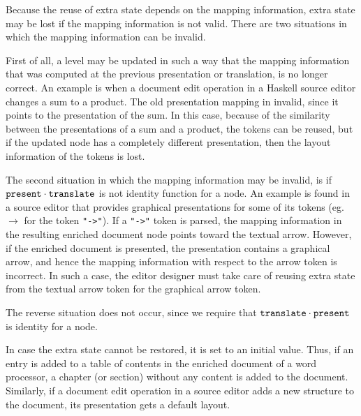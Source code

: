Because the reuse of extra state depends on the mapping information, extra state may be lost if the mapping information is not valid. There are two situations in which the mapping information can be invalid.  

First of all, a level may be updated in such a way that the mapping information that was computed at the previous presentation or translation, is no longer correct. An example is when a document edit operation in a Haskell source editor changes a sum to a product. The old presentation mapping in invalid, since it points to the presentation of the sum. In this case, because of the similarity between the presentations of a sum and a product, the tokens can be reused, but if the updated node has a completely different presentation, then the layout information of the tokens is lost.

The second situation in which the mapping information may be invalid, is if 
${\tt present} \cdot {\tt translate}$ is not identity function for a node.  An example is found in a source editor that provides graphical presentations for some of its tokens (eg. $\rightarrow$ for the token \verb|"->"|). If a \verb|"->"| token is parsed, the mapping information in the resulting enriched document node points toward the textual arrow. However, if the enriched document is presented, the presentation contains a graphical arrow, and hence the mapping information with respect to the arrow token is incorrect. In such a case, the editor designer must take care of reusing extra state from the textual arrow token for the graphical arrow token.

The reverse situation does not occur, since we require that ${\tt translate} \cdot {\tt present}$ is identity for a node. 

In case the extra state cannot be restored, it is set to an initial value. Thus, if an entry is added to a table of contents in the enriched document of a word processor, a chapter (or section) without any content is added to the document. Similarly, if a document edit operation in a source editor adds a new structure to the document, its presentation gets a default layout.

